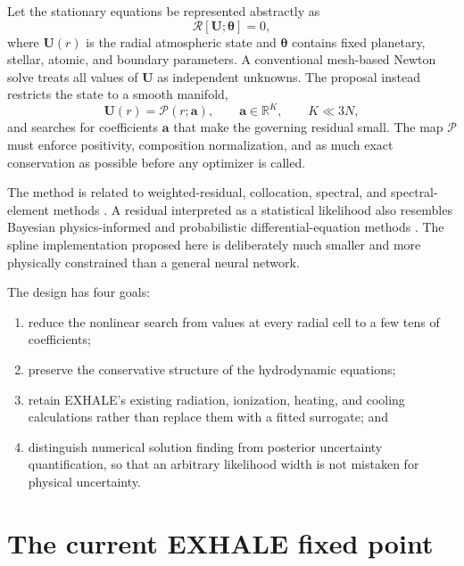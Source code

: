 \documentclass[english,a4paper]{my_memo}
\newcommand{\vect}[1]{\mathbf{#1}}
\newcommand{\Ustate}{\vect{U}}
\newcommand{\coef}{\vect{a}}
\begin{document}
Let the stationary equations be represented abstractly as
\begin{equation}
  \mathcal{R}[\Ustate;\boldsymbol{\theta}]=0,
  \label{eq:operator}
\end{equation}
where \(\Ustate(r)\) is the radial atmospheric state and
\(\boldsymbol{\theta}\) contains fixed planetary, stellar, atomic, and boundary
parameters.  A conventional mesh-based Newton solve treats all values of
\(\Ustate\) as independent unknowns.  The proposal instead restricts the state
to a smooth manifold,
\begin{equation}
  \Ustate(r) = \mathcal{P}(r;\coef), \qquad
  \coef\in\mathbb{R}^{K}, \qquad K\ll 3N,
  \label{eq:reducedmap}
\end{equation}
and searches for coefficients \(\coef\) that make the governing residual small.
The map \(\mathcal{P}\) must enforce positivity, composition normalization, and
as much exact conservation as possible before any optimizer is called.

The method is related to weighted-residual, collocation, spectral, and
spectral-element methods \cite{Finlayson1972,Canuto2006,Trefethen2000}.  A
residual interpreted as a statistical likelihood also resembles Bayesian
physics-informed and probabilistic differential-equation methods
\cite{Chkrebtii2016,Yang2021,Kramer2021}.  The spline implementation proposed
here is deliberately much smaller and more physically constrained than a
general neural network.

The design has four goals:
\begin{enumerate}
\item reduce the nonlinear search from values at every radial cell to a few
  tens of coefficients;
\item preserve the conservative structure of the hydrodynamic equations;
\item retain EXHALE's existing radiation, ionization, heating, and cooling
  calculations rather than replace them with a fitted surrogate; and
\item distinguish numerical solution finding from posterior uncertainty
  quantification, so that an arbitrary likelihood width is not mistaken for
  physical uncertainty.
\end{enumerate}

\section{The current EXHALE fixed point}\label{sec:current}
\end{document}
